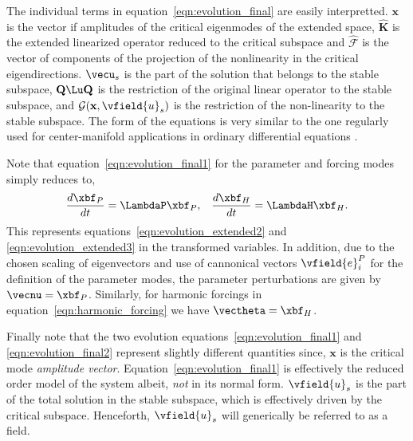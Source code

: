  The individual terms in equation~\eqref{eqn:evolution_final} are easily interpretted. $\mathbf{x}$ is the vector if amplitudes of the critical eigenmodes of the extended space, $\mathbf{\widehat{K}}$ is the extended linearized operator reduced to the critical subspace and $\mathcal{\widehat{F}}$ is the vector of components of the projection of the nonlinearity in the critical eigendirections. $\vecu_{s}$ is the part of the solution that belongs to the stable subspace, $\mathbf{Q}\Lu\mathbf{Q}$ is the restriction of the original linear operator to the stable subspace, and $\mathcal{G}(\mathbf{x},\vfield{u}_{s})$ is the restriction of the non-linearity to the stable subspace. The form of the equations is very similar to the one regularly used for center-manifold applications in ordinary differential equations \citep{guckenheimer83,wiggins03}. 
 
 Note that equation~\eqref{eqn:evolution_final1} for the parameter and forcing modes simply reduces to,
 \begin{align} 	
 	\dfrac{d \xbf_{P}}{d t} = \LambdaP\xbf_{P}, && 	\dfrac{d \xbf_{H}}{d t} = \LambdaH\xbf_{H}. \nonumber
 \end{align}
This represents equations~\eqref{eqn:evolution_extended2} and \eqref{eqn:evolution_extended3} in the transformed variables. In addition, due to the chosen scaling of eigenvectors and use of cannonical vectors $\vfield{e}^{P}_{i}$ for the definition of the parameter modes, the parameter perturbations are given by $\vecnu = \xbf_{P}$. Similarly, for harmonic forcings in equation~\eqref{eqn:harmonic_forcing} we have $\vectheta = \xbf_{H}$. 

Finally note that the two evolution equations~\eqref{eqn:evolution_final1} and \eqref{eqn:evolution_final2} represent slightly different quantities since, $\mathbf{x}$ is the critical mode \emph{amplitude vector}. Equation~\eqref{eqn:evolution_final1} is effectively the reduced order model of the system albeit, \emph{not} in its normal form. $\vfield{u}_{s}$ is the part of the total solution in the stable subspace, which is effectively driven by the critical subspace. Henceforth, $\vfield{u}_{s}$ will generically be referred to as a field. 

